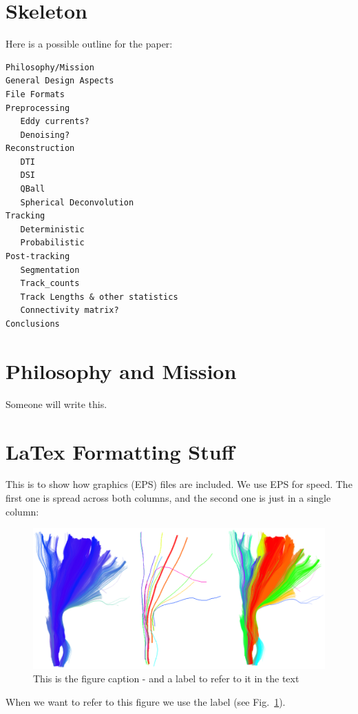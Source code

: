 \documentclass{bioinfo}
\begin{document}
\section{Skeleton}

Here is a possible outline for the paper:

\begin{verbatim}
Philosophy/Mission
General Design Aspects
File Formats 
Preprocessing
   Eddy currents?
   Denoising?
Reconstruction
   DTI 
   DSI
   QBall
   Spherical Deconvolution 
Tracking
   Deterministic
   Probabilistic
Post-tracking
   Segmentation
   Track_counts
   Track Lengths & other statistics
   Connectivity matrix?
Conclusions
\end{verbatim}

\section{Philosophy and Mission}

Someone will write this.

\section{LaTex Formatting Stuff}

This is to show how graphics (EPS) files are included. We use EPS for
speed. The first one is spread across both columns, and the second one
is just in a single column:

\begin{figure}
\centerline{\includegraphics[width=160mm]{Figures/Fig_4_cst_simplification_relabeled_triple.eps}}
\caption{This is the figure caption - and a label to refer to it in the text \label{Fig:big_picture}}
\end{figure}

When we want to refer to this figure we use the label (see
Fig.~\ref{Fig:big_picture}).
\end{document}
